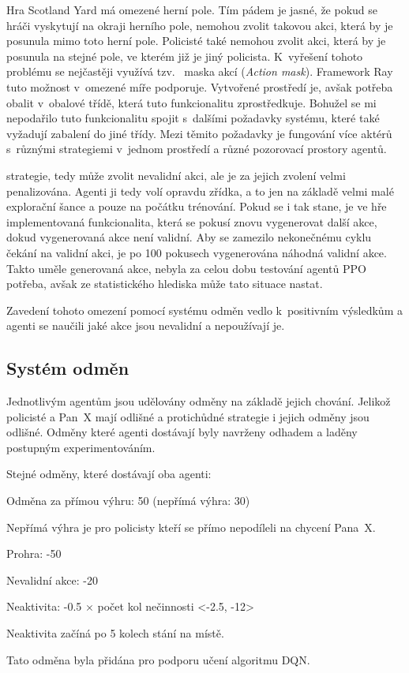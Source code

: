 Hra Scotland Yard má omezené herní pole.
Tím pádem je jasné, že pokud se hráči vyskytují na okraji herního pole, nemohou zvolit takovou akci, která by je posunula mimo toto herní pole.
Policisté také nemohou zvolit akci, která by je posunula na stejné pole, ve kterém již je jiný policista.
K~vyřešení tohoto problému se nejčastěji využívá tzv.~ maska akcí (\emph{Action mask}).
Framework Ray tuto možnost v~omezené míře podporuje.
Vytvořené prostředí je, avšak potřeba obalit v~obalové třídě, která tuto funkcionalitu zprostředkuje.
Bohužel se mi nepodařilo tuto funkcionalitu spojit s~dalšími požadavky systému, které také vyžadují zabalení do jiné třídy.
Mezi těmito požadavky je fungování více aktérů s~různými strategiemi v~jednom prostředí a různé pozorovací prostory agentů.

strategie, tedy může zvolit nevalidní akci, ale je za jejich zvolení velmi penalizována.
Agenti ji tedy volí opravdu zřídka, a to jen na základě velmi malé explorační šance a pouze na počátku trénování.
Pokud se i tak stane, je ve hře implementovaná funkcionalita, která se pokusí znovu vygenerovat další akce, dokud vygenerovaná akce není validní.
Aby se zamezilo nekonečnému cyklu čekání na validní akci, je po 100 pokusech vygenerována náhodná validní akce.
Takto uměle generovaná akce, nebyla za celou dobu testování agentů PPO potřeba, avšak ze statistického hlediska může tato situace nastat.

Zavedení tohoto omezení pomocí systému odměn vedlo k~positivním výsledkům a agenti se naučili jaké akce jsou nevalidní a nepoužívají je.

\subsection{Systém odměn}
\label{subsec:odmeny}

Jednotlivým agentům jsou udělovány odměny na základě jejich chování.
Jelikož policisté a Pan~X mají odlišné a protichůdné strategie i jejich odměny jsou odlišné.
Odměny které agenti dostávají byly navrženy odhadem a laděny postupným experimentováním.

\bigskip

Stejné odměny, které dostávají oba agenti:
\begin{myitemize}
  \item Odměna za přímou výhru: 50 (nepřímá výhra: 30)
  \begin{myitemize}
    \item Nepřímá výhra je pro policisty kteří se přímo nepodíleli na chycení Pana~X\@.
  \end{myitemize}
  \item Prohra: -50
  \item Nevalidní akce: -20
  \item Neaktivita: -0.5 $\times$ počet kol nečinnosti <-2.5, -12>
  \begin{myitemize}
    \item Neaktivita začíná po 5 kolech stání na místě.
    \item Tato odměna byla přidána pro podporu učení algoritmu DQN\@.
  \end{myitemize}
\end{myitemize}


